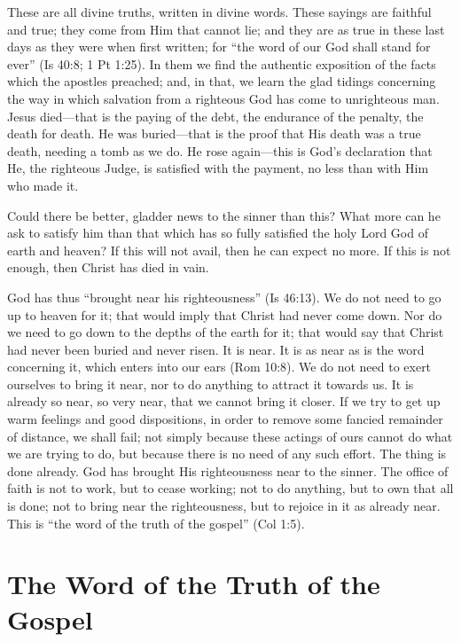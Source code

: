 \documentclass[
]{book}
\begin{document}
These are all divine truths, written in divine words. These sayings are faithful and true; they come from Him that cannot lie; and they are as true in these last days as they were when first written; for ``the word of our God shall stand for ever'' (Is 40:8; 1 Pt 1:25). In them we find the authentic exposition of the facts which the apostles preached; and, in that, we learn the glad tidings concerning the way in which salvation from a righteous God has come to unrighteous man. Jesus died---that is the paying of the debt, the endurance of the penalty, the death for death. He was buried---that is the proof that His death was a true death, needing a tomb as we do. He rose again---this is God's declaration that He, the righteous Judge, is satisfied with the payment, no less than with Him who made it.

Could there be better, gladder news to the sinner than this? What more can he ask to satisfy him than that which has so fully satisfied the holy Lord God of earth and heaven? If this will not avail, then he can expect no more. If this is not enough, then Christ has died in vain.

God has thus ``brought near his righteousness'' (Is 46:13). We do not need to go up to heaven for it; that would imply that Christ had never come down. Nor do we need to go down to the depths of the earth for it; that would say that Christ had never been buried and never risen. It is near. It is as near as is the word concerning it, which enters into our ears (Rom 10:8). We do not need to exert ourselves to bring it near, nor to do anything to attract it towards us. It is already so near, so very near, that we cannot bring it closer. If we try to get up warm feelings and good dispositions, in order to remove some fancied remainder of distance, we shall fail; not simply because these actings of ours cannot do what we are trying to do, but because there is no need of any such effort. The thing is done already. God has brought His righteousness near to the sinner. The office of faith is not to work, but to cease working; not to do anything, but to own that all is done; not to bring near the righteousness, but to rejoice in it as already near. This is ``the word of the truth of the gospel'' (Col 1:5).

\hypertarget{the-word-of-the-truth-of-the-gospel}{%
\chapter{The Word of the Truth of the Gospel}\label{the-word-of-the-truth-of-the-gospel}}
\end{document}
